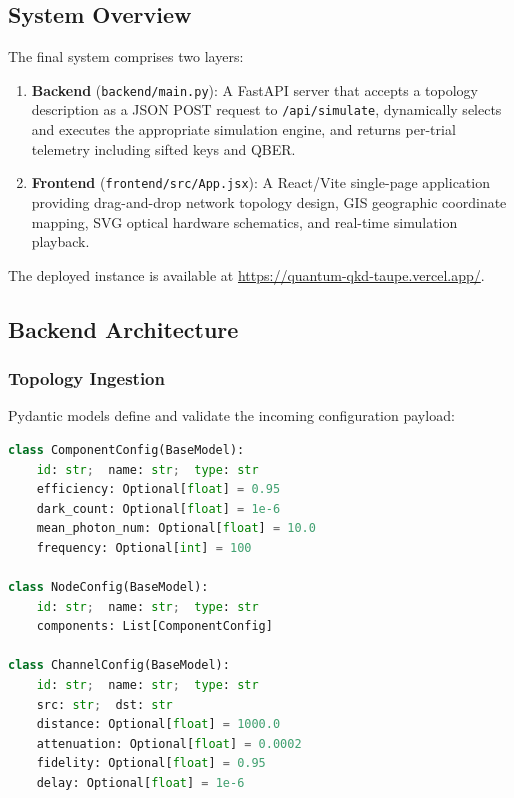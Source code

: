 \documentclass[12pt,oneside,letterpaper,english]{article}
\begin{document}
\subsection{System Overview}

The final system comprises two layers:
\begin{enumerate}
    \item \textbf{Backend} (\texttt{backend/main.py}): A FastAPI server that accepts a topology description as a JSON POST request to \texttt{/api/simulate}, dynamically selects and executes the appropriate simulation engine, and returns per-trial telemetry including sifted keys and QBER.
    \item \textbf{Frontend} (\texttt{frontend/src/App.jsx}): A React/Vite single-page application providing drag-and-drop network topology design, GIS geographic coordinate mapping, SVG optical hardware schematics, and real-time simulation playback.
\end{enumerate}

The deployed instance is available at \url{https://quantum-qkd-taupe.vercel.app/}.

\subsection{Backend Architecture}

\subsubsection{Topology Ingestion}

Pydantic models define and validate the incoming configuration payload:

\begin{lstlisting}[language=Python, caption={Pydantic configuration models}]
class ComponentConfig(BaseModel):
    id: str;  name: str;  type: str
    efficiency: Optional[float] = 0.95
    dark_count: Optional[float] = 1e-6
    mean_photon_num: Optional[float] = 10.0
    frequency: Optional[int] = 100

class NodeConfig(BaseModel):
    id: str;  name: str;  type: str
    components: List[ComponentConfig]

class ChannelConfig(BaseModel):
    id: str;  name: str;  type: str
    src: str;  dst: str
    distance: Optional[float] = 1000.0
    attenuation: Optional[float] = 0.0002
    fidelity: Optional[float] = 0.95
    delay: Optional[float] = 1e-6
\end{lstlisting}
\end{document}
